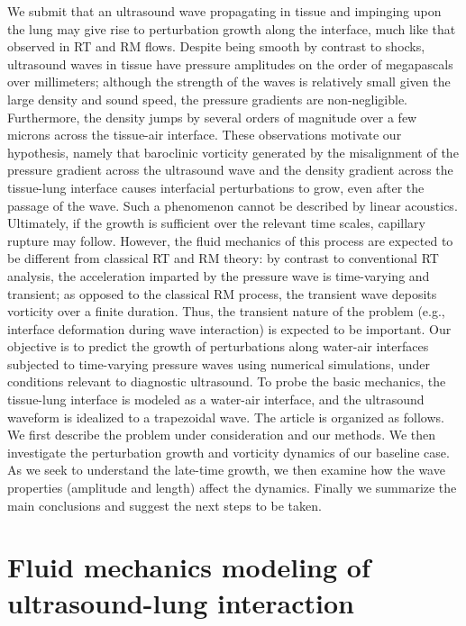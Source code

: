 
We submit that an ultrasound wave propagating in tissue and impinging
upon the lung may give rise to perturbation growth along the
interface, much like that observed in RT and RM flows. Despite being
smooth by contrast to shocks, ultrasound waves in tissue have pressure
amplitudes on the order of megapascals over millimeters; although the
strength of the waves is relatively small given the large density and
sound speed, the pressure gradients are non-negligible. Furthermore,
the density jumps by several orders of magnitude over a few microns
across the tissue-air interface. These observations motivate our
hypothesis, namely that baroclinic vorticity generated by the
misalignment of the pressure gradient across the ultrasound wave and
the density gradient across the tissue-lung interface causes
interfacial perturbations to grow, even after the passage of the
wave. Such a phenomenon cannot be described by linear
acoustics. Ultimately, if the growth is sufficient over the relevant
time scales, capillary rupture may follow. However, the fluid
mechanics of this process are expected to be different from classical
RT and RM theory: by contrast to conventional RT analysis, the
acceleration imparted by the pressure wave is time-varying and
transient; as opposed to the classical RM process, the transient wave
deposits vorticity over a finite duration. Thus, the transient nature
of the problem (e.g., interface deformation during wave interaction)
is expected to be important.  Our objective is to predict the growth
of perturbations along water-air interfaces subjected to time-varying
pressure waves using numerical simulations, under conditions relevant
to diagnostic ultrasound. To probe the basic mechanics, the
tissue-lung interface is modeled as a water-air interface, and the
ultrasound waveform is idealized to a trapezoidal wave. The article is
organized as follows. We first describe the problem under
consideration and our methods. We then investigate the perturbation
growth and vorticity dynamics of our baseline case. As we seek to
understand the late-time growth, we then examine how the wave
properties (amplitude and length) affect the dynamics. Finally we
summarize the main conclusions and suggest the next steps to be taken.


\section{Fluid mechanics modeling of ultrasound-lung interaction}%
\label{sec:methods}%

